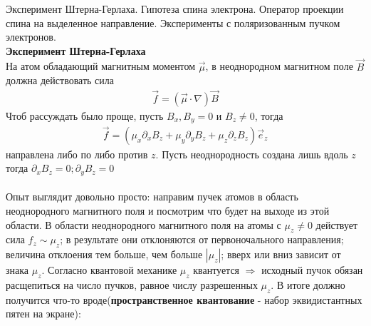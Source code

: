 \documentclass[__main__.tex]{subfiles}
\begin{document}
	
	Эксперимент Штерна-Герлаха. Гипотеза спина электрона. Оператор проекции спина на выделенное направление. Эксперименты с поляризованным пучком электронов.\\ 
	
	\textbf{Эксперимент Штерна-Герлаха}\\
	На атом обладающий магнитным моментом $\vec{\mu}$, в неоднородном магнитном поле $\vec{B}$ должна действовать сила
	\begin{gather*}
		\vec{f} = \left(\vec{\mu}\cdot\nabla\right)\vec{B}
	\end{gather*}
	Чтоб рассуждать было проще, пусть $B_x, B_y = 0$  и $B_z \neq 0$, тогда
	\begin{gather*}
		\vec{f} = \left(\mu_x\partial_xB_z+\mu_y\partial_yB_z+\mu_z\partial_zB_z\right)\vec{e}_z
	\end{gather*}
	направлена либо по либо против $z$. Пусть неоднородность создана лишь вдоль $z$ тогда $\partial_xB_z=0; \partial_yB_z=0$\\\\
	Опыт выглядит довольно просто: направим пучек атомов в область неоднородного магнитного поля и посмотрим что будет на выходе из этой области.
	В области неоднородного магнитного поля на атомы с $\mu_z \neq 0$ действует сила $f_z \sim \mu_z$; в результате они отклоняются от первоночального направления; величина отклоения тем больше, чем больше $|\mu_z|$; вверх или вниз зависит от знака $\mu_z$.
	Согласно квантовой механике $\mu_z$ квантуется $\Rightarrow$ исходный пучок обязан расщепиться на число пучков, равное числу разрешенных $\mu_z$. В итоге должно получится что-то вроде(\textbf{пространственное квантование} - набор эквидистантных пятен на экране):
	\begin{figure}[h]
		\center{\texttt{[image: ch-18]}}
	\end{figure}
\end{document}

